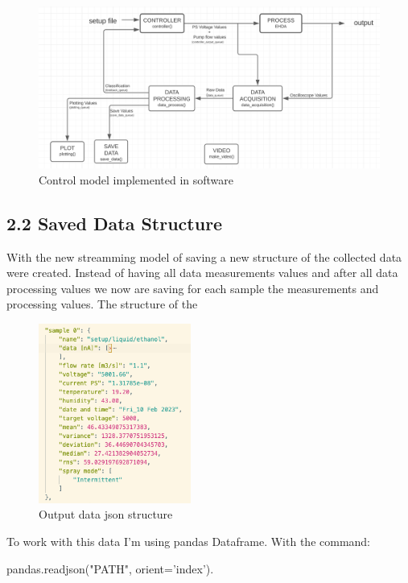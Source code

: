     \begin{figure}[H]
        \center
        \includegraphics[width=18cm]{images/image_folder_report_4/new_system_design.png}
        \caption{Control model implemented in software}
    \end{figure}


\subsection*{2.2 Saved Data Structure}

    With the new streamming model of saving a new structure of the collected data were created.
    Instead of having all data measurements values and after all data processing values we now are saving for each sample the measurements and processing values.
    The structure of the 

    \begin{figure}[H]
        \center
        \includegraphics[width=5cm]{images/image_folder_report_4/json_structure.png}
        \caption{Output data json structure}
    \end{figure}

    To work with this data I'm using pandas Dataframe.
    With the command:
    
    pandas.read\textunderscore{}json("PATH", orient='index').

